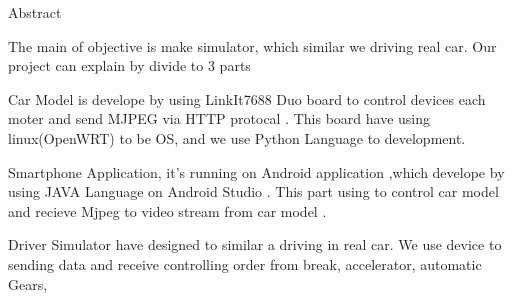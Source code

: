 Abstract

	The main of objective is make simulator, which similar we driving real car. Our  project can explain by divide to 3 parts

Car Model is develope by using LinkIt7688 Duo board to control devices each moter and send MJPEG via HTTP protocal . This board have using linux(OpenWRT) to be OS, and we use Python Language to development.

Smartphone Application, it's running on Android application ,which develope by using JAVA Language on Android Studio . This part using to control car model and recieve Mjpeg to video stream from car model .

Driver Simulator have designed to similar a driving in real car. We use device to sending data and receive controlling order from break, accelerator, automatic Gears, 
